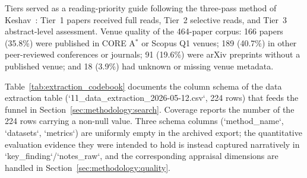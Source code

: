 Tiers served as a reading-priority guide following the three-pass method of
Keshav~\cite{Keshav2007}: Tier~1 papers received full reads, Tier~2
selective reads, and Tier~3 abstract-level assessment. Venue quality of the
464-paper corpus: 166 papers (35.8\%) were published in CORE A$^*$ or Scopus
Q1 venues; 189 (40.7\%) in other peer-reviewed conferences or journals; 91
(19.6\%) were arXiv preprints without a published venue; and 18 (3.9\%) had
unknown or missing venue metadata.

Table~\ref{tab:extraction_codebook} documents the column schema of the data
extraction table (`11\_data\_extraction\_2026-05-12.csv`, 224 rows) that feeds
the funnel in Section~\ref{sec:methodology:search}. Coverage reports the number
of the 224 rows carrying a non-null value. Three schema columns
(`method\_name`, `datasets`, `metrics`) are uniformly empty in the archived
export; the quantitative evaluation evidence they were intended to hold is
instead captured narratively in `key\_finding`/`notes\_raw`, and the
corresponding appraisal dimensions are handled in
Section~\ref{sec:methodology:quality}.

